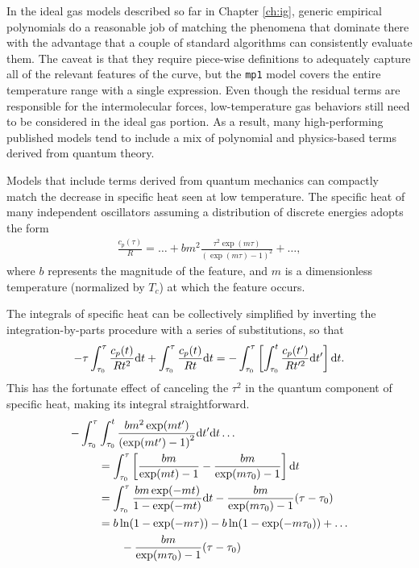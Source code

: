 In the ideal gas models described so far in Chapter \ref{ch:ig}, generic empirical polynomials do a reasonable job of matching the phenomena that dominate there with the advantage that a couple of standard algorithms can consistently evaluate them.  The caveat is that they require piece-wise definitions to adequately capture all of the relevant features of the curve, but the \verb|mp1| model covers the entire temperature range with a single expression.  Even though the residual terms are responsible for the intermolecular forces, low-temperature gas behaviors still need to be considered in the ideal gas portion.  As a result, many high-performing published models tend to include a mix of polynomial and physics-based terms derived from quantum theory.

Models that include terms derived from quantum mechanics can compactly match the decrease in specific heat seen at low temperature.  The specific heat of many independent oscillators assuming a distribution of discrete energies adopts the form
\begin{align}
\frac{c_p(\tau)}{R} = \ldots + b m^2 \frac{\tau^2 \exp(m\tau)}{\left(\exp(m\tau) - 1\right)^2} + \ldots\nonumber,
\end{align}
where $b$ represents the magnitude of the feature, and $m$ is a dimensionless temperature (normalized by $T_c$) at which the feature occurs.

The integrals of specific heat can be collectively simplified by inverting the integration-by-parts procedure with a series of substitutions, so that
\begin{align}
-\tau \int_{\tau_0}^\tau \frac{c_p(t)}{Rt^2} \mathrm{d} t + \int_{\tau_0}^\tau \frac{c_p(t)}{Rt} \mathrm{d} t = - \int_{\tau_0}^\tau \left[ \int_{\tau_0}^t \frac{c_p(t')}{Rt'^2} \mathrm{d} t'\right] \mathrm{d} t.
\end{align}
This has the fortunate effect of canceling the $\tau^2$ in the quantum component of specific heat, making its integral straightforward.
\begin{align}
-\int_{\tau_0}^\tau &\int_{\tau_0}^t \frac{b m^2 \exp(m t')}{\left(\exp(m t') - 1\right)^2} \mathrm{d} t' \mathrm{d} t  \ldots\nonumber\\
 &= \int_{\tau_0}^\tau \left[ \frac{b m}{\exp(m t) - 1} - \frac{b m}{\exp(m \tau_0) - 1} \right] \mathrm{d} t \nonumber\\
 &= \int_{\tau_0}^\tau \frac{b m\exp(-mt)}{1 - \exp(-mt)}\mathrm{d} t - \frac{b m}{\exp(m\tau_0)-1}(\tau - \tau_0) \nonumber\\
 &= b\ln(1-\exp(-m\tau)) - b\ln(1-\exp(-m\tau_0)) + \ldots\nonumber\\
 & \hspace{2em} -\frac{b m}{\exp(m\tau_0)-1}(\tau - \tau_0)
\end{align}

